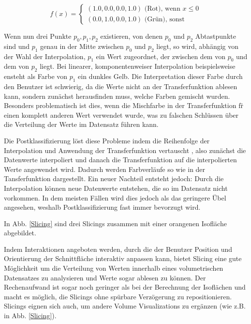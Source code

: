 \documentclass[a4paper,fontsize=12pt,toc=bib,halfparskip]{scrartcl}
\begin{document}
\begin{equation}
	f(x)= 
	\begin{cases}
		(1.0, 0.0, 0.0, 1.0)\text{ (Rot), wenn } x\leq 0\\
		(0.0, 1.0, 0.0, 1.0)\text{ (Gr\"un), sonst}
	\end{cases}
\end{equation}

Wenn nun drei Punkte $p_0, p_1, p_2$ existieren, von denen $p_0$ und $p_2$ Abtastpunkte sind und $p_1$ genau in der Mitte zwischen $p_0$ und $p_2$ liegt, so wird, abh\"angig von der Wahl der Interpolation, $p_1$ ein Wert zugeordnet, der zwischen dem von $p_0$ und dem von $p_2$ liegt. Bei linearer, komponentenweiser Interpolation beispielsweise ensteht als Farbe von $p_1$ ein dunkles Gelb. Die Interpretation dieser Farbe durch den Benutzer ist schwierig, da die Werte nicht an der Transferfunktion ablesen kann, sondern zun\"achst herausfinden muss, welche Farben gemischt wurden. Besonders problematisch ist dies, wenn die Mischfarbe in der Transferfunktion f\"r einen komplett anderen Wert verwendet wurde, was zu falschen Schl\"ussen \"uber die Verteilung der Werte im Datensatz f\"uhren kann.

Die Postklassifizierung l\"ost diese Probleme indem die Reihenfolge der Interpolation und Anwendung der Transferfunktion vertauscht , also zun\"achst die Datenwerte interpoliert und danach die Transferfunktion auf die interpolierten Werte angewendet wird. Dadurch werden Farbverl\"aufe so wie in der Tansferfunktion dargestellt. Ein neuer Nachteil entsteht jedoch: Durch die Interpolation k\"onnen neue Datenwerte entstehen, die so im Datensatz nicht vorkommen. In dem meisten F\"allen wird dies jedoch als das geringere \"Ubel angesehen, weshalb Postklassifizierung fast immer bevorzugt wird.

In Abb. \ref{Slicing} sind drei Slicings zusammen mit einer orangenen Isofl\"ache abgebildet.

Indem Interaktionen angeboten werden, durch die der Benutzer Position und Orientierung der Schnittfl\"ache interaktiv anpassen kann, bietet Slicing eine gute M\"oglichkeit um die Verteilung von Werten innerhalb eines volumetrischen Datensatzes zu analysieren und Werte sogar ablesen zu k\"onnen. Der Rechenaufwand ist sogar noch geringer als bei der Berechnung der Isofl\"achen und macht es m\"oglich, die Slicings ohne sp\"urbare Verz\"ogerung zu repositionieren. Slicings eignen sich auch, um andere Volume Visualizations zu erg\"anzen (wie z.B. in Abb. \ref{Slicing}).
\end{document}
